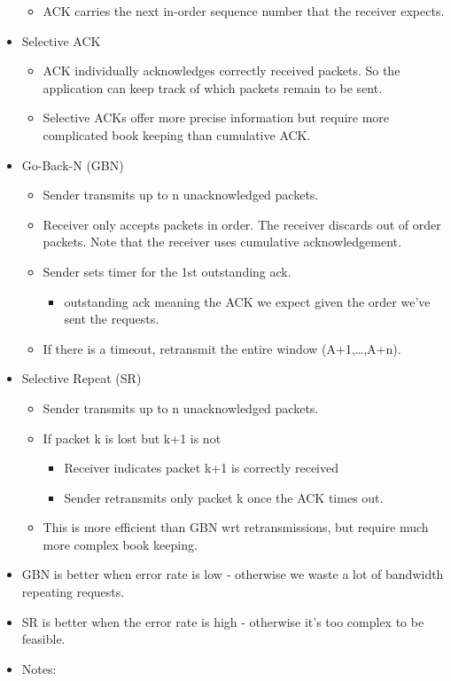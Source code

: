 \documentclass[]{article}
\providecommand{\tightlist}{%
  \setlength{\itemsep}{0pt}\setlength{\parskip}{0pt}}
\begin{document}
\begin{itemize}
  \begin{itemize}
  \tightlist
  \item
    ACK carries the next in-order sequence number that the receiver
    expects.
  \end{itemize}
\item
  Selective ACK

  \begin{itemize}
  \tightlist
  \item
    ACK individually acknowledges correctly received packets. So the
    application can keep track of which packets remain to be sent.
  \item
    Selective ACKs offer more precise information but require more
    complicated book keeping than cumulative ACK.
  \end{itemize}
\item
  Go-Back-N (GBN)

  \begin{itemize}
  \tightlist
  \item
    Sender transmits up to n unacknowledged packets.
  \item
    Receiver only accepts packets in order. The receiver discards out of
    order packets. Note that the receiver uses cumulative
    acknowledgement.
  \item
    Sender sets timer for the 1st outstanding ack.

    \begin{itemize}
    \tightlist
    \item
      outstanding ack meaning the ACK we expect given the order we've
      sent the requests.
    \end{itemize}
  \item
    If there is a timeout, retransmit the entire window
    (A+1,\ldots{},A+n).
  \end{itemize}
\item
  Selective Repeat (SR)

  \begin{itemize}
  \tightlist
  \item
    Sender transmits up to n unacknowledged packets.
  \item
    If packet k is lost but k+1 is not

    \begin{itemize}
    \tightlist
    \item
      Receiver indicates packet k+1 is correctly received
    \item
      Sender retransmits only packet k once the ACK times out.
    \end{itemize}
  \item
    This is more efficient than GBN wrt retransmissions, but require
    much more complex book keeping.
  \end{itemize}
\item
  GBN is better when error rate is low - otherwise we waste a lot of
  bandwidth repeating requests.
\item
  SR is better when the error rate is high - otherwise it's too complex
  to be feasible.
\item
  Notes:


\end{itemize}
\end{document}
